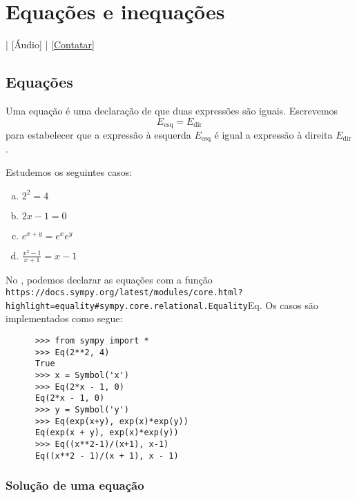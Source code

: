

\chapter{Equações e inequações}\label{cap_ineq}
\thispagestyle{fancy}

\begin{flushright}
  [Vídeo] | [Áudio] | \href{https://phkonzen.github.io/notas/contato.html}{[Contatar]}
\end{flushright}

\section{Equações}\label{cap_ineq_sec_eq}

Uma equação é uma declaração de que duas expressões são iguais. Escrevemos
\begin{equation}
  E_{\text{esq}} = E_{\text{dir}}
\end{equation}
para estabelecer que a expressão à esquerda $E_{\text{esq}}$ é igual a expressão à direita $E_{\text{dir}}$.

\begin{ex}
  Estudemos os seguintes casos:
  \begin{enumerate}[a)]
  \item $2^2 = 4$
  \item $2x - 1 = 0$
  \item $e^{x+y} = e^xe^y$
  \item $\displaystyle \frac{x^2-1}{x+1} = x - 1$
  \end{enumerate}

  \begin{ifispython}
    No \python, podemos declarar as equações com a função \lstinline{https://docs.sympy.org/latest/modules/core.html?highlight=equality#sympy.core.relational.Equality}{Eq}. Os casos são implementados como segue:
    \begin{lstlisting}
      >>> from sympy import *
      >>> Eq(2**2, 4)
      True
      >>> x = Symbol('x')
      >>> Eq(2*x - 1, 0)
      Eq(2*x - 1, 0)
      >>> y = Symbol('y')
      >>> Eq(exp(x+y), exp(x)*exp(y))
      Eq(exp(x + y), exp(x)*exp(y))
      >>> Eq((x**2-1)/(x+1), x-1)
      Eq((x**2 - 1)/(x + 1), x - 1)
    \end{lstlisting}
  \end{ifispython}
\end{ex}

\subsection{Solução de uma equação}

